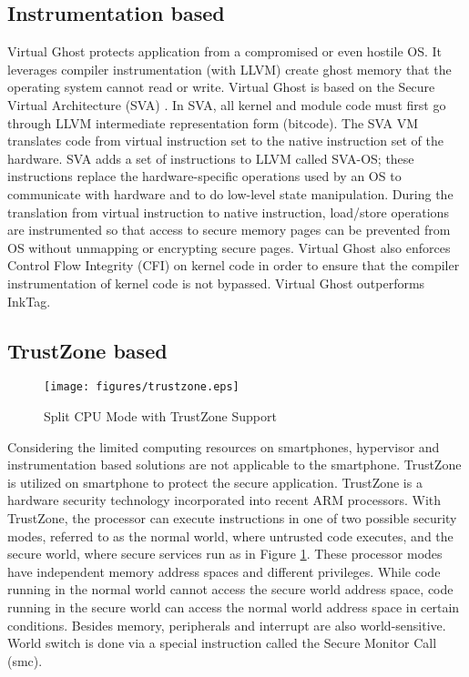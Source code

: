 \subsection{Instrumentation based}

Virtual Ghost protects application from a compromised or even hostile OS. It
leverages compiler instrumentation (with LLVM) create ghost memory that the
operating system cannot read or write. Virtual Ghost is based on the Secure
Virtual Architecture (SVA) \cite{SVA}. In SVA, all kernel and module code must first go
through LLVM intermediate representation form (bitcode). The SVA VM translates
code from virtual instruction set to the native instruction set of the hardware.
SVA adds a set of instructions to LLVM called SVA-OS; these instructions replace
the hardware-specific operations used by an OS to communicate with hardware and
to do low-level state manipulation. During the translation from virtual
instruction to native instruction, load/store operations are instrumented so
that access to secure memory pages can be prevented from OS without unmapping or
encrypting secure pages. Virtual Ghost also enforces Control Flow Integrity
(CFI) \cite{CFI} on kernel code in order to ensure that the compiler instrumentation of
kernel code is not bypassed. Virtual Ghost outperforms InkTag.

\subsection{TrustZone based}

\begin{figure}[htb]
\centering
\texttt{[image: figures/trustzone.eps]}
\caption{Split CPU Mode with TrustZone Support}
\label{fig:trustzone}
\end{figure}

Considering the limited computing resources on smartphones, hypervisor and
instrumentation based solutions are not applicable to the smartphone. TrustZone
\cite{trustzone}
is utilized on smartphone to protect the secure application. TrustZone is a
hardware security technology incorporated into recent ARM processors. With
TrustZone, the processor can execute instructions in one of two possible
security modes, referred to as the normal world, where untrusted code executes,
and the secure world, where secure services run as in Figure
\ref{fig:trustzone}. These processor modes have independent memory address
spaces and different privileges. While code running in the normal world cannot
access the secure world address space, code running in the secure world can
access the normal world address space in certain conditions. Besides memory,
peripherals and interrupt are also world-sensitive. World switch is done via a
special instruction called the Secure Monitor Call (smc).

